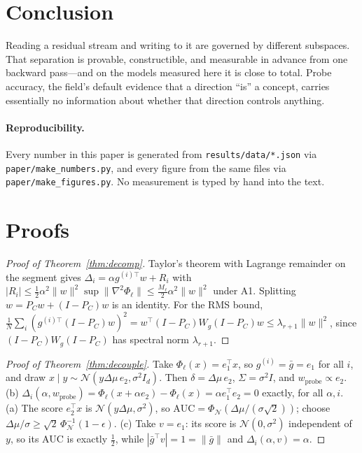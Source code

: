 \documentclass[11pt]{article}
\theoremstyle{definition}
\theoremstyle{remark}
\newcommand{\gbar}{\bar{g}}
\newcommand{\Wg}{W_{g}}
\begin{document}
\section{Conclusion}

Reading a residual stream and writing to it are governed by different subspaces.
That separation is provable, constructible, and measurable in advance from one
backward pass---and on the models measured here it is close to total. Probe
accuracy, the field's default evidence that a direction ``is'' a concept,
carries essentially no information about whether that direction controls
anything.

\paragraph{Reproducibility.} Every number in this paper is generated from
\texttt{results/data/*.json} via \texttt{paper/make\_numbers.py}, and every
figure from the same files via \texttt{paper/make\_figures.py}. No measurement
is typed by hand into the text.

\appendix

\section{Proofs}
\label{app:proofs}

\begin{proof}[Proof of Theorem~\ref{thm:decomp}]
Taylor's theorem with Lagrange remainder on the segment gives
$\Delta_i = \alpha g^{(i)\top}w + R_i$ with
$|R_i|\le\frac12\alpha^2\|w\|^2\sup\|\nabla^2\Phi_\ell\|\le\frac{M_\ell}{2}\alpha^2\|w\|^2$
under A1. Splitting $w=P_Cw+(I-P_C)w$ is an identity. For the RMS bound,
$\frac1N\sum_i(g^{(i)\top}(I-P_C)w)^2 = w^\top(I-P_C)\Wg(I-P_C)w \le \lambda_{r+1}\|w\|^2$,
since $(I-P_C)\Wg(I-P_C)$ has spectral norm $\lambda_{r+1}$.
\end{proof}

\begin{proof}[Proof of Theorem~\ref{thm:decouple}]
Take $\Phi_\ell(x)=e_1^\top x$, so $g^{(i)}=\gbar=e_1$ for all $i$, and draw
$x\mid y\sim\mathcal{N}(y\Delta\mu\,e_2,\sigma^2 I_d)$. Then $\delta=\Delta\mu\,e_2$,
$\Sigma=\sigma^2I$, and $w_{\mathrm{probe}}\propto e_2$.
(b) $\Delta_i(\alpha,w_{\mathrm{probe}})=\Phi_\ell(x+\alpha e_2)-\Phi_\ell(x)=\alpha e_1^\top e_2=0$
exactly, for all $\alpha,i$.
(a) The score $e_2^\top x$ is $\mathcal{N}(y\Delta\mu,\sigma^2)$, so
$\mathrm{AUC}=\Phi_{\mathcal N}(\Delta\mu/(\sigma\sqrt2))$; choose
$\Delta\mu/\sigma \ge \sqrt2\,\Phi_{\mathcal N}^{-1}(1-\epsilon)$.
(c) Take $v=e_1$: its score is $\mathcal{N}(0,\sigma^2)$ independent of $y$, so
its AUC is exactly $\tfrac12$, while $|\gbar^\top v|=1=\|\gbar\|$ and
$\Delta_i(\alpha,v)=\alpha$.
\end{proof}
\end{document}
